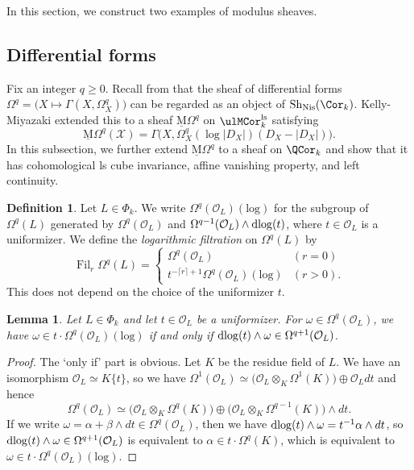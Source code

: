 \documentclass{amsart}
\theoremstyle{plain}
\newtheorem{lemma}[theorem]{Lemma}
\theoremstyle{definition}
\newtheorem{definition}[theorem]{Definition}
\theoremstyle{remark}
\numberwithin{equation}{section}
\DeclareMathOperator{\Sh}{Sh}
\DeclareMathOperator{\Fil}{Fil}
\def\ceil#1{\lceil #1 \rceil}
\def\Nis{\mathrm{Nis}}
\def\ls{\mathrm{ls}}
\def\MOmega{\underline{\mathrm{M}}\Omega}
\def\logrm{\mathrm{log}}
\begin{document}
In this section, we construct two examples of modulus sheaves.

\subsection{Differential forms}

Fix an integer $q\geq 0$.
Recall from \cite[Corollary A.6.1]{KSY1} that the sheaf of differential forms $\Omega^q=\bigl(X\mapsto \Gamma(X,\Omega^q_X)\bigr)$ can be regarded as an object of $\Sh_\Nis(\Cor_k)$.
Kelly-Miyazaki \cite[Theorem 4.3]{KellyMiyazaki_Hodge2} extended this to a sheaf $\MOmega^q$ on $\ulMCor_k^\ls$ satisfying
$$
	\MOmega^q(\mathcal{X})=\Gamma\bigl(X,\Omega^q_X(\log|D_X|)(D_X-|D_X|)\bigr).
$$
In this subsection, we further extend $\MOmega^q$ to a sheaf on $\QCor_k$ and show that it has cohomological ls cube invariance, affine vanishing property, and left continuity.



\begin{definition}
	Let $L\in \Phi_k$.
	We write $\Omega^q(\mathcal{O}_L)(\logrm)$ for the subgroup of $\Omega^q(L)$ generated by $\Omega^q(\mathcal{O}_L)$ and $\Omega^{q-1}(\mathcal{O}_L)\wedge\operatorname{dlog}(t)$, where $t\in \mathcal{O}_L$ is a uniformizer.
	We define the \emph{logarithmic filtration} on $\Omega^q(L)$ by
	$$
		\Fil_r \Omega^q(L)=\begin{cases}
			\Omega^q(\mathcal{O}_L)&(r=0)\\
			t^{-\ceil{r}+1}\Omega^q(\mathcal{O}_L)(\logrm)&(r>0).
		\end{cases}
	$$
	This does not depend on the choice of the uniformizer $t$.
\end{definition}

\begin{lemma}\label{omega_max}
	Let $L\in \Phi_k$ and let $t\in \mathcal{O}_L$ be a uniformizer.
	For $\omega\in \Omega^q(\mathcal{O}_L)$, we have $\omega\in t\cdot \Omega^q(\mathcal{O}_L)(\logrm)$ if and only if $\operatorname{dlog}(t)\wedge\omega\in \Omega^{q+1}(\mathcal{O}_L)$.
\end{lemma}

\begin{proof}
	The `only if' part is obvious.
	Let $K$ be the residue field of $L$.
	We have an isomorphism $\mathcal{O}_L\simeq K\{t\}$, so we have $\Omega^1(\mathcal{O}_L)\simeq \bigl(\mathcal{O}_L\otimes_K\Omega^1(K)\bigr)\oplus \mathcal{O}_L dt$ and hence
	$$
		\Omega^q(\mathcal{O}_L)\simeq \bigl(\mathcal{O}_L\otimes_K\Omega^q(K)\bigr)\oplus \bigl(\mathcal{O}_L\otimes_K\Omega^{q-1}(K)\bigr)\wedge dt.
	$$
	If we write $\omega = \alpha+\beta\wedge dt\in \Omega^q(\mathcal{O}_L)$, then we have $\operatorname{dlog}(t)\wedge\omega = t^{-1}\alpha\wedge dt$, so $\operatorname{dlog}(t)\wedge\omega\in \Omega^{q+1}(\mathcal{O}_L)$ is equivalent to $\alpha\in t\cdot \Omega^q(K)$, which is equivalent to $\omega\in t\cdot \Omega^q(\mathcal{O}_L)(\logrm)$.
\end{proof}
\end{document}
